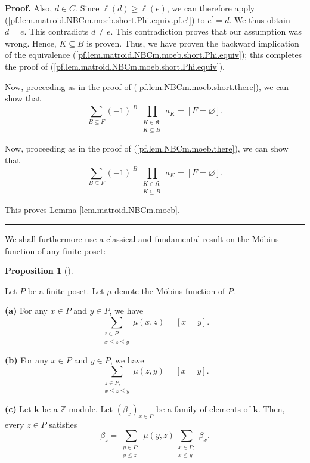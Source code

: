 \documentclass[numbers=enddot,12pt,final,onecolumn,notitlepage]{scrartcl}%
\theoremstyle{definition}
\newtheorem{prop}[theo]{Proposition}
\newenvironment{proposition}[1][]
{\begin{prop}[#1]\begin{leftbar}}
{\end{leftbar}\end{prop}}
\newenvironment{proof}[1][Proof]{\noindent\textbf{#1.} }{\ \rule{0.5em}{0.5em}}
\newenvironment{verlong}{}{}
\newenvironment{vershort}{}{}
\let\sumnonlimits\sum
\let\prodnonlimits\prod
\renewcommand{\sum}{\sumnonlimits\limits}
\renewcommand{\prod}{\prodnonlimits\limits}
\begin{document}
\begin{proof}
Also, $d\in C$. Since $\ell\left(  d\right)  \geq\ell\left(  e\right)  $, we
can therefore apply (\ref{pf.lem.matroid.NBCm.moeb.short.Phi.equiv.pf.e'}) to
$e^{\prime}=d$. We thus obtain $d=e$. This contradicts $d\neq e$. This
contradiction proves that our assumption was wrong. Hence, $K\subseteq B$ is
proven. Thus, we have proven the backward implication of the equivalence
(\ref{pf.lem.matroid.NBCm.moeb.short.Phi.equiv}); this completes the proof of
(\ref{pf.lem.matroid.NBCm.moeb.short.Phi.equiv}).

\begin{vershort}
Now, proceeding as in the proof of (\ref{pf.lem.NBCm.moeb.short.there}), we
can show that
\[
\sum_{B\subseteq F}\left(  -1\right)  ^{\left\vert B\right\vert }%
\prod_{\substack{K\in\mathfrak{K};\\K\subseteq B}}a_{K}=\left[  F=\varnothing
\right]  .
\]

\end{vershort}

\begin{verlong}
Now, proceeding as in the proof of (\ref{pf.lem.NBCm.moeb.there}), we can show
that
\[
\sum_{B\subseteq F}\left(  -1\right)  ^{\left\vert B\right\vert }%
\prod_{\substack{K\in\mathfrak{K};\\K\subseteq B}}a_{K}=\left[  F=\varnothing
\right]  .
\]

\end{verlong}

\noindent This proves Lemma \ref{lem.matroid.NBCm.moeb}.
\end{proof}

We shall furthermore use a classical and fundamental result on the M\"{o}bius
function of any finite poset:

\begin{proposition}
\label{prop.moebius.double0}Let $P$ be a finite poset. Let $\mu$ denote the
M\"{o}bius function of $P$.

\textbf{(a)} For any $x\in P$ and $y\in P$, we have%
\begin{equation}
\sum_{\substack{z\in P;\\x\leq z\leq y}}\mu\left(  x,z\right)  =\left[
x=y\right]  . \label{eq.prop.moebius.double0.a}%
\end{equation}


\textbf{(b)} For any $x\in P$ and $y\in P$, we have%
\begin{equation}
\sum_{\substack{z\in P;\\x\leq z\leq y}}\mu\left(  z,y\right)  =\left[
x=y\right]  . \label{eq.prop.moebius.double0.b}%
\end{equation}


\textbf{(c)} Let $\mathbf{k}$ be a $\mathbb{Z}$-module. Let $\left(  \beta
_{x}\right)  _{x\in P}$ be a family of elements of $\mathbf{k}$. Then, every
$z\in P$ satisfies%
\[
\beta_{z}=\sum_{\substack{y\in P;\\y\leq z}}\mu\left(  y,z\right)
\sum_{\substack{x\in P;\\x\leq y}}\beta_{x}.
\]

\end{proposition}
\end{document}
